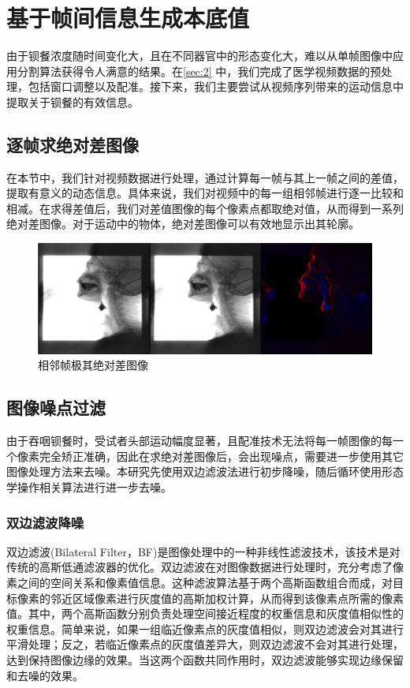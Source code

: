 \section{基于帧间信息生成本底值}\label{sec:3}

由于钡餐浓度随时间变化大，且在不同器官中的形态变化大，难以从单帧图像中应用分割算法获得令人满意的结果。在\cref{sec:2} 中，我们完成了医学视频数据的预处理，包括窗口调整以及配准。接下来，我们主要尝试从视频序列带来的运动信息中提取关于钡餐的有效信息。

\subsection{逐帧求绝对差图像}

在本节中，我们针对视频数据进行处理，通过计算每一帧与其上一帧之间的差值，提取有意义的动态信息。具体来说，我们对视频中的每一组相邻帧进行逐一比较和相减。在求得差值后，我们对差值图像的每个像素点都取绝对值，从而得到一系列绝对差图像。对于运动中的物体，绝对差图像可以有效地显示出其轮廓。

\begin{figure}[!htp]
    \centering
    \includegraphics[width=\textwidth]{figures/3_1.png}
    \caption{相邻帧极其绝对差图像}
    \label{fig:3_2_绝对差}
\end{figure}

\subsection{图像噪点过滤}

由于吞咽钡餐时，受试者头部运动幅度显著，且配准技术无法将每一帧图像的每一个像素完全矫正准确，因此在求绝对差图像后，会出现噪点，需要进一步使用其它图像处理方法来去噪。本研究先使用双边滤波法进行初步降噪，随后循环使用形态学操作相关算法进行进一步去噪。

\subsubsection{双边滤波降噪}

双边滤波(Bilateral Filter，BF)是图像处理中的一种非线性滤波技术，该技术是对传统的高斯低通滤波器的优化。双边滤波在对图像数据进行处理时，充分考虑了像素之间的空间关系和像素值信息。这种滤波算法基于两个高斯函数组合而成，对目标像素的邻近区域像素进行灰度值的高斯加权计算，从而得到该像素点所需的像素值。其中，两个高斯函数分别负责处理空间接近程度的权重信息和灰度值相似性的权重信息。简单来说，如果一组临近像素点的灰度值相似，则双边滤波会对其进行平滑处理；反之，若临近像素点的灰度值差异大，则双边滤波不会对其进行处理，达到保持图像边缘的效果。当这两个函数共同作用时，双边滤波能够实现边缘保留和去噪的效果。


